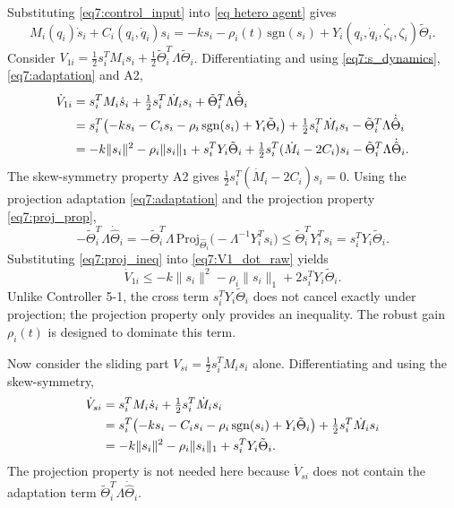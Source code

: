 Substituting \eqref{eq7:control_input} into \eqref{eq hetero agent} gives
\begin{equation}\label{eq7:s_dynamics}
	M_i(q_i)\dot{s}_i + C_i(q_i,\dot{q}_i)s_i
	= -k s_i - \rho_i(t)\,\mathrm{sgn}(s_i)
	+ Y_i(q_i,\dot{q}_i,\dot{\zeta}_i,\zeta_i)\tilde{\Theta}_i.
\end{equation}
Consider $V_{1i} = \frac12 s_i^T M_i s_i + \frac12 \tilde{\Theta}_i^T \Lambda \tilde{\Theta}_i$.
Differentiating and using \eqref{eq7:s_dynamics}, \eqref{eq7:adaptation} and A2,
\begin{align}
	\dot{V}_{1i}
	&= s_i^T M_i \dot{s}_i + \tfrac12 s_i^T \dot{M}_i s_i
		+ \tilde{\Theta}_i^T \Lambda \dot{\tilde{\Theta}}_i \notag\\
	&= s_i^T\bigl(-k s_i - C_i s_i - \rho_i\,\mathrm{sgn}(s_i) + Y_i\tilde{\Theta}_i\bigr)
		+ \tfrac12 s_i^T \dot{M}_i s_i
		- \tilde{\Theta}_i^T \Lambda \dot{\hat{\Theta}}_i \notag\\
	&= -k\|s_i\|^2 - \rho_i\|s_i\|_1 + s_i^T Y_i\tilde{\Theta}_i
		+ \tfrac12 s_i^T(\dot{M}_i - 2C_i)s_i
		- \tilde{\Theta}_i^T \Lambda \dot{\hat{\Theta}}_i. \label{eq7:V1_dot_raw}
\end{align}
The skew-symmetry property A2 gives $\tfrac12 s_i^T(\dot{M}_i - 2C_i)s_i = 0$.
Using the projection adaptation \eqref{eq7:adaptation} and the projection property
\eqref{eq7:proj_prop},
\begin{equation}
	-\tilde{\Theta}_i^T \Lambda \dot{\hat{\Theta}}_i
	= -\tilde{\Theta}_i^T \Lambda\,\mathrm{Proj}_{\hat{\Theta}_i}\bigl(-\Lambda^{-1}Y_i^T s_i\bigr)
	\le \tilde{\Theta}_i^T Y_i^T s_i = s_i^T Y_i\tilde{\Theta}_i. \label{eq7:proj_ineq}
\end{equation}
Substituting \eqref{eq7:proj_ineq} into \eqref{eq7:V1_dot_raw} yields
\begin{equation}
	\dot{V}_{1i} \le -k\|s_i\|^2 - \rho_i\|s_i\|_1 + 2 s_i^T Y_i\tilde{\Theta}_i. \label{eq7:V1_dot_proj}
\end{equation}
Unlike Controller 5-1, the cross term $s_i^T Y_i\tilde{\Theta}_i$ does not cancel exactly
under projection; the projection property only provides an inequality.  The robust gain
$\rho_i(t)$ is designed to dominate this term.

Now consider the sliding part $V_{si} = \frac12 s_i^T M_i s_i$ alone.
Differentiating and using the skew-symmetry,
\begin{align}
	\dot{V}_{si}
	&= s_i^T M_i \dot{s}_i + \tfrac12 s_i^T \dot{M}_i s_i \notag\\
	&= s_i^T\bigl(-k s_i - C_i s_i - \rho_i\,\mathrm{sgn}(s_i) + Y_i\tilde{\Theta}_i\bigr)
		+ \tfrac12 s_i^T \dot{M}_i s_i \notag\\
	&= -k\|s_i\|^2 - \rho_i\|s_i\|_1 + s_i^T Y_i\tilde{\Theta}_i. \label{eq7:Vs_dot}
\end{align}
The projection property is not needed here because $\dot{V}_{si}$ does not contain the
adaptation term $\tilde{\Theta}_i^T \Lambda \dot{\hat{\Theta}}_i$.

